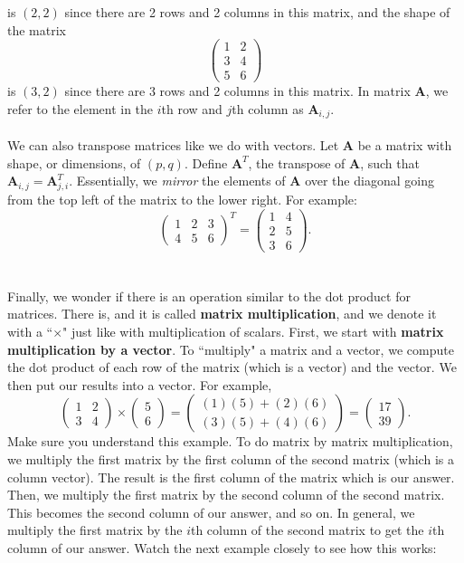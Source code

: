 \documentclass{article}
\begin{document}
is $(2,2)$ since there are 2 rows and 2 columns in this matrix, and the shape of the matrix 
\[\begin{pmatrix}
1 & 2\\
3 & 4\\
5 & 6
\end{pmatrix}\]
is $(3,2)$ since there are 3 rows and 2 columns in this matrix. In matrix \textbf{A}, we refer to the element in the $i$th row and $j$th column as $\textbf{A}_{i,j}$.
\\
\\
We can also transpose matrices like we do with vectors. Let \textbf{A} be a matrix with shape, or dimensions, of $(p,q)$. Define $\textbf{A}^T$, the transpose of \textbf{A}, such that $\textbf{A}_{i,j}=\textbf{A}^T_{j,i}$. Essentially, we \textit{mirror} the elements of \textbf{A} over the diagonal going from the top left of the matrix to the lower right. For example:
\[
\begin{pmatrix}
1 & 2 & 3\\
4 & 5 & 6
\end{pmatrix}^T=
\begin{pmatrix}
1 & 4\\
2 & 5\\
3 & 6
\end{pmatrix}.
\]
\\
\\
Finally, we wonder if there is an operation similar to the dot product for matrices. There is, and it is called \textbf{matrix multiplication}, and we denote it with a ``$\times$" just like with multiplication of scalars. First, we start with \textbf{matrix multiplication by a vector}. To ``multiply" a matrix and a vector, we compute the dot product of each row of the matrix (which is a vector) and the vector. We then put our results into a vector. For example, 
\[\begin{pmatrix}
1 & 2\\
3 & 4
\end{pmatrix}\times \begin{pmatrix}
5\\
6
\end{pmatrix}=\begin{pmatrix}
(1)(5)+(2)(6)\\
(3)(5)+(4)(6)
\end{pmatrix}=\begin{pmatrix}
17\\
39
\end{pmatrix}.\]
Make sure you understand this example. To do matrix by matrix multiplication, we multiply the first matrix by the first column of the second matrix (which is a column vector). The result is the first column of the matrix which is our answer. Then, we multiply the first matrix by the second column of the second matrix. This becomes the second column of our answer, and so on. In general, we multiply the first matrix by the $i$th column of the second matrix to get the $i$th column of our answer. Watch the next example closely to see how this works: 
\end{document}
